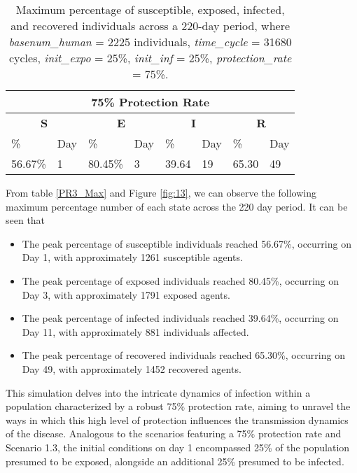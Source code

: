 \begin{table} [H]
	\centering
	\begin{tabular}{|l|l|l|l|l|l|l|l|}
		
		\hline
		\multicolumn{8}{|c|}{\textbf{75\% Protection Rate}}\\
		\hline
		\multicolumn{2}{|c|}{\textbf{S}} &  \multicolumn{2}{c|}{\textbf{E}}&  \multicolumn{2}{c|}{\textbf{I}}&  \multicolumn{2}{c|}{\textbf{R}}\\
		\hline
		\%& Day & \% & Day & \%  & Day & \% & Day \\
		\hline
		56.67\% & 1 &80.45\%  & 3 &  39.64  & 19 & 65.30  &49\\
		\hline
	\end{tabular}
	\caption{Maximum percentage of susceptible, exposed, infected, and recovered individuals across a 220-day period, where \textit{basenum\_human} = 2225 individuals, \textit{time\_cycle} = 31680 cycles, \textit{init\_expo} = 25\%, \textit{init\_inf} = 25\%,  \textit{protection\_rate} = 75\%.}
	\label{PR4_Max}
\end{table}


From table \ref{PR3_Max} and Figure \ref{fig:13}, we can observe the following maximum percentage number of each state across the 220 day period. It can be seen that 

\begin{itemize}
	\item The peak percentage of susceptible individuals reached 56.67\%, occurring on Day 1, with approximately 1261 susceptible agents.
	\item The peak percentage of exposed individuals reached 80.45\%, occurring on Day 3, with approximately 1791 exposed agents.
	\item The peak percentage of infected individuals reached 39.64\%, occurring on Day 11, with approximately 881 individuals affected.
	\item The peak percentage of recovered individuals reached 65.30\%, occurring on Day 49, with approximately 1452 recovered agents.
\end{itemize}

This simulation delves into the intricate dynamics of infection within a population characterized by a robust 75\% protection rate, aiming to unravel the ways in which this high level of protection influences the transmission dynamics of the disease. Analogous to the scenarios featuring a 75\% protection rate and Scenario 1.3, the initial conditions on day 1 encompassed 25\% of the population presumed to be exposed, alongside an additional 25\% presumed to be infected.


